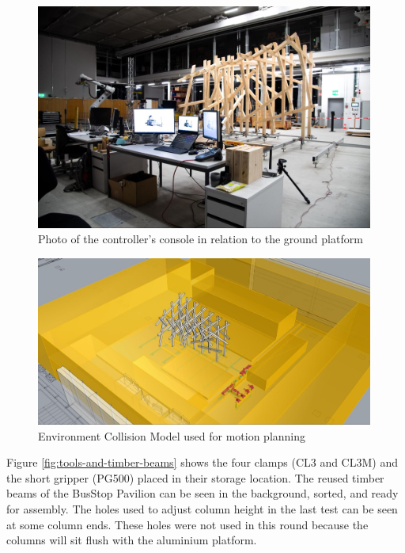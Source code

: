 \begin{figure}[!h]
    \centering
    \includegraphics[width=0.99\textwidth]{images/6b/img01.jpg}
    \caption{Photo of the controller’s console in relation to the ground platform}
    \label{fig:controller-console}
\end{figure}


\begin{figure}[!h]
    \centering
    \includegraphics[width=0.99\textwidth]{images/6b/img02.jpg}
    \caption{Environment Collision Model used for motion planning}
    \label{fig:environment-collision-model}
\end{figure}

Figure \ref{fig:tools-and-timber-beams} shows the four clamps (CL3 and CL3M) and the short gripper (PG500) placed in their storage location. The reused timber beams of the BusStop Pavilion can be seen in the background, sorted, and ready for assembly. The holes used to adjust column height in the last test can be seen at some column ends. These holes were not used in this round because the columns will sit flush with the aluminium platform.

